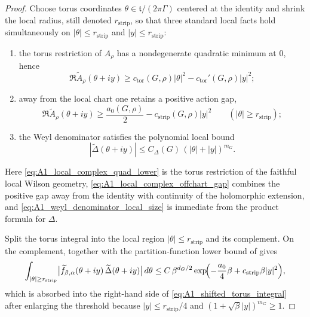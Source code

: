 \begin{proof}
Choose torus coordinates $\theta\in\mathfrak t/(2\pi\Gamma)$ centered at the identity and shrink the local radius, still denoted $r_{\mathrm{strip}}$, so that three standard local facts hold simultaneously on
$|\theta|\le r_{\mathrm{strip}}$ and $|y|\le r_{\mathrm{strip}}$:
\begin{enumerate}[label=\textup{(\roman*)}]
\item the torus restriction of $A_\rho$ has a nondegenerate quadratic minimum at $0$, hence
\begin{equation}\label{eq:A1_local_complex_quad_lower}
\Re\widetilde A_\rho(\theta+iy)
\ge
c_{\mathrm{tor}}(G,\rho)|\theta|^2-c_{\mathrm{tor}}'(G,\rho)|y|^2;
\end{equation}
\item away from the local chart one retains a positive action gap,
\begin{equation}\label{eq:A1_local_complex_offchart_gap}
\Re\widetilde A_\rho(\theta+iy)
\ge
\frac{a_0(G,\rho)}{2}-c_{\mathrm{strip}}(G,\rho)|y|^2
\qquad(|\theta|\ge r_{\mathrm{strip}});
\end{equation}
\item the Weyl denominator satisfies the polynomial local bound
\begin{equation}\label{eq:A1_weyl_denominator_local_size}
|\widetilde\Delta(\theta+iy)|
\le
C_\Delta(G)\,(|\theta|+|y|)^{m_G}.
\end{equation}
\end{enumerate}
Here \eqref{eq:A1_local_complex_quad_lower} is the torus restriction of the faithful local Wilson geometry, \eqref{eq:A1_local_complex_offchart_gap} combines the positive gap away from the identity with continuity of the holomorphic extension, and \eqref{eq:A1_weyl_denominator_local_size} is immediate from the product formula for $\Delta$.

Split the torus integral into the local region $|\theta|\le r_{\mathrm{strip}}$ and its complement.
On the complement,  together with the partition-function lower bound of  gives
\[
\int_{|\theta|\ge r_{\mathrm{strip}}}
\bigl|\widetilde f_{\beta,\alpha}(\theta+iy)\,\widetilde\Delta(\theta+iy)\bigr|\,d\theta
\le
C\,\beta^{d_G/2}
\exp\!\Bigl(-\frac{a_0}{4}\beta+c_{\mathrm{strip}}\beta|y|^2\Bigr),
\]
which is absorbed into the right-hand side of \eqref{eq:A1_shifted_torus_integral} after enlarging the threshold because $|y|\le r_{\mathrm{strip}}/4$ and $(1+\sqrt\beta|y|)^{m_G}\ge 1$.


\end{proof}
